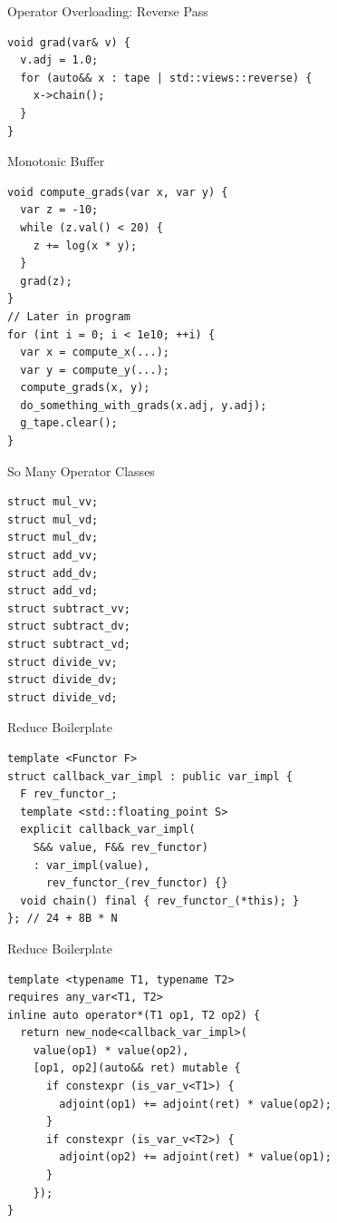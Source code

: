\documentclass[dvipsnames]{beamer}
\begin{document}
\begin{frame}[fragile]{Operator Overloading: Reverse Pass}
\begin{verbatim}
void grad(var& v) {
  v.adj = 1.0;
  for (auto&& x : tape | std::views::reverse) {
    x->chain();
  }
}
\end{verbatim}
\end{frame}

\begin{frame}[fragile]{Monotonic Buffer}
\begin{verbatim}
void compute_grads(var x, var y) {
  var z = -10;
  while (z.val() < 20) {
    z += log(x * y);
  }
  grad(z);
}
// Later in program
for (int i = 0; i < 1e10; ++i) {
  var x = compute_x(...);
  var y = compute_y(...);
  compute_grads(x, y);
  do_something_with_grads(x.adj, y.adj);
  g_tape.clear();
}
\end{verbatim}
\end{frame}

\begin{frame}[fragile]{So Many Operator Classes}
\begin{verbatim}
struct mul_vv;
struct mul_vd;
struct mul_dv;
struct add_vv;
struct add_dv;
struct add_vd;
struct subtract_vv;
struct subtract_dv;
struct subtract_vd;
struct divide_vv;
struct divide_dv;
struct divide_vd;
\end{verbatim}
\end{frame}


\begin{frame}[fragile]{Reduce Boilerplate}
\begin{verbatim}
template <Functor F>
struct callback_var_impl : public var_impl {
  F rev_functor_;
  template <std::floating_point S>
  explicit callback_var_impl(
    S&& value, F&& rev_functor)
    : var_impl(value),
      rev_functor_(rev_functor) {}
  void chain() final { rev_functor_(*this); }
}; // 24 + 8B * N
\end{verbatim}
\end{frame}

\begin{frame}[fragile]{Reduce Boilerplate}
\begin{verbatim}
template <typename T1, typename T2>
requires any_var<T1, T2>
inline auto operator*(T1 op1, T2 op2) {
  return new_node<callback_var_impl>(
    value(op1) * value(op2),
    [op1, op2](auto&& ret) mutable {
      if constexpr (is_var_v<T1>) {
        adjoint(op1) += adjoint(ret) * value(op2);
      }
      if constexpr (is_var_v<T2>) {
        adjoint(op2) += adjoint(ret) * value(op1);
      }
    });
}
\end{verbatim}
\end{frame}
\end{document}

